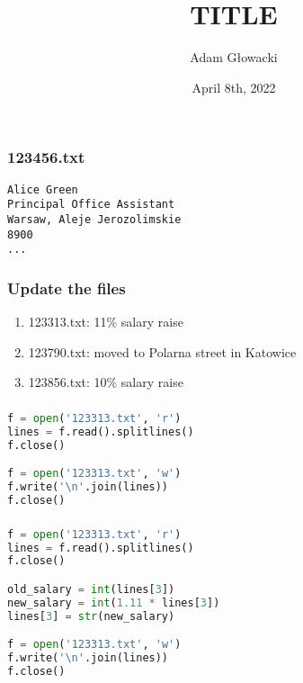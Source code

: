 \documentclass[aspectratio=169]{beamer}
\title{TITLE}
\author{Adam Głowacki}
\date{April 8th, 2022}
\begin{document}
\begin{frame}
\titlepage
\end{frame}

\begin{frame}[fragile]
\frametitle{123456.txt}
\begin{verbatim}
Alice Green
Principal Office Assistant
Warsaw, Aleje Jerozolimskie
8900
...
\end{verbatim}
\end{frame}

\begin{frame}
\frametitle{Update the files}
\begin{enumerate}
  \item 123313.txt: 11\% salary raise
  \item 123790.txt: moved to Polarna street in Katowice
  \item 123856.txt: 10\% salary raise
\end{enumerate}
\end{frame}

\begin{frame}[fragile]
\frametitle{}
\begin{lstlisting}[language=python]
f = open('123313.txt', 'r')
lines = f.read().splitlines()
f.close()

f = open('123313.txt', 'w')
f.write('\n'.join(lines))
f.close()
\end{lstlisting}
\end{frame}

\begin{frame}[fragile]
\frametitle{}
\begin{lstlisting}[language=python]
f = open('123313.txt', 'r')
lines = f.read().splitlines()
f.close()

old_salary = int(lines[3])
new_salary = int(1.11 * lines[3])
lines[3] = str(new_salary)

f = open('123313.txt', 'w')
f.write('\n'.join(lines))
f.close()
\end{lstlisting}
\end{frame}
\end{document}
